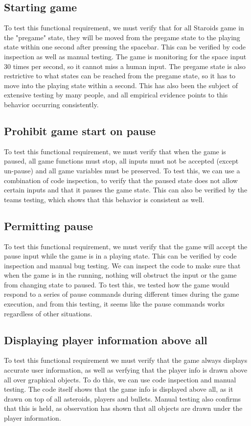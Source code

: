 \documentclass[12pt, titlepage]{article}
\begin{document}
\subsection{Starting game}
To test this functional requirement, we must verify that for all Staroids game in the "pregame" state,
they will be moved from the pregame state to the playing state within one second after pressing the spacebar.
This can be verified by code inspection as well as manual testing.
The game is monitoring for the space input 30 times per second, so it cannot miss a human input.
The pregame state is also restrictive to what states can be reached from the pregame state,
so it has to move into the playing state within a second.
This has also been the subject of extensive testing by many people,
and all empirical evidence points to this behavior occurring consistently.
\subsection{Prohibit game start on pause}
To test this functional requirement, we must verify that when the game is paused,
all game functions must stop, all inputs must not be accepted (except un-pause)
and all game variables must be preserved.
To test this, we can use a combination of code inspection,
to verify that the paused state does not allow certain inputs and that it pauses the game state.
This can also be verified by the teams testing, which shows that this behavior is consistent as well.
\subsection{Permitting pause}
To test this functional requirement, we must verify that the game will accept the pause input
while the game is in a playing state.
This can be verified by code inspection and manual bug testing.
We can inspect the code to make sure that when the game is in the running,
nothing will obstruct the input or the game from changing state to paused.
To test this, we tested how the game would respond to a series of pause commands during
different times during the game execution, and from this testing,
it seems like the pause commands works regardless of other situations.
\subsection{Displaying player information above all}
To test this functional requirement we must verify that the game always displays accurate user information, as well as verfying that the player info is drawn above all over graphical objects. To do this, we can use code inspection and manual testing. The code itself shows that the game info is displayed above all, as it drawn on top of all asteroids, players and bullets. Manual testing also confirms that this is held, as observation has shown that all objects are drawn under the player information.
\end{document}
